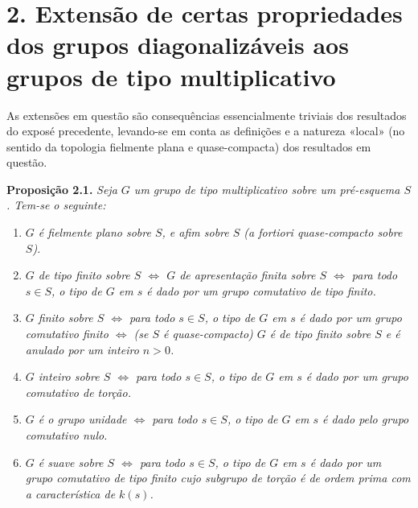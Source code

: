 

\section*{2. Extensão de certas
propriedades dos grupos diagonalizáveis aos grupos de tipo
multiplicativo}

As extensões em questão são consequências essencialmente triviais
dos resultados do exposé precedente, levando-se em conta as definições
 e a natureza «local»
(no sentido da topologia fielmente plana e quase-compacta) dos
resultados em questão.


\medskip
\noindent{}\textbf{Proposição 2.1.}
\textit{Seja \(G\) um grupo de tipo multiplicativo sobre um pré-esquema
\(S\). Tem-se o seguinte:}
\begin{enumerate}
  \item[(a)]
  \textit{\(G\) é fielmente plano sobre \(S\), e afim sobre \(S\)
  (a fortiori quase-compacto sobre \(S\)).}

  \item[(b)]
  \textit{\(G\) de tipo finito sobre \(S\) \(\Longleftrightarrow\)
  \(G\) de apresentação finita sobre \(S\) \(\Longleftrightarrow\)
  para todo \(s\in S\), o tipo de \(G\) em \(s\) é dado por um
  grupo comutativo de tipo finito.}

  \item[(c)]
  \textit{\(G\) finito sobre \(S\) \(\Longleftrightarrow\) para
  todo \(s\in S\), o tipo de \(G\) em \(s\) é dado por um grupo
  comutativo finito \(\Longleftrightarrow\) (se \(S\) é
  quase-compacto) \(G\) é de tipo finito sobre \(S\) e é anulado
  por um inteiro \(n>0\).}

  \item[\((c')\)]
  \textit{\(G\) inteiro sobre \(S\) \(\Longleftrightarrow\) para
  todo \(s\in S\), o tipo de \(G\) em \(s\) é dado por um grupo
  comutativo de torção.}

  \item[(d)]
  \textit{\(G\) é o grupo unidade \(\Longleftrightarrow\) para
  todo \(s\in S\), o tipo de \(G\) em \(s\) é dado pelo grupo
  comutativo nulo.}

  \item[(e)]
  \textit{\(G\) é suave sobre \(S\) \(\Longleftrightarrow\) para
  todo \(s\in S\), o tipo de \(G\) em \(s\) é dado por um grupo
  comutativo de tipo finito cujo subgrupo de torção é de ordem prima
  com a característica de \(k(s)\).}
\end{enumerate}

